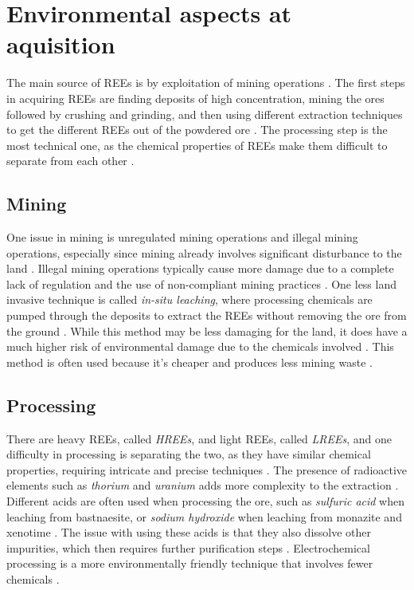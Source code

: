 
\section{Environmental aspects at aquisition}

The main source of REEs is by exploitation of mining operations \cite{REELandscape}. The first steps in acquiring REEs are finding deposits of high concentration, mining the ores followed by crushing and grinding, and then using different extraction techniques to get the different REEs out of the powdered ore \cite{REELandscape}. The processing step is the most technical one, as the chemical properties of REEs make them difficult to separate from each other \cite{britannica2024}.

\subsection{Mining}

One issue in mining is unregulated mining operations and illegal mining operations, especially since mining already involves significant disturbance to the land \cite{unregulatedMining}. Illegal mining operations typically cause more damage due to a complete lack of regulation and the use of non-compliant mining practices \cite{unregulatedMining}. One less land invasive technique is called \textit{in-situ leaching}, where processing chemicals are pumped through the deposits to extract the REEs without removing the ore from the ground \cite{REELandscape}. While this method may be less damaging for the land, it does have a much higher risk of environmental damage due to the chemicals involved \cite{unregulatedMining}. This method is often used because it's cheaper and produces less mining waste \cite{unregulatedMining}.

\subsection{Processing}

There are heavy REEs, called \textit{HREEs}, and light REEs, called \textit{LREEs}, and one difficulty in processing is separating the two, as they have similar chemical properties, requiring intricate and precise techniques \cite{HREELREE}. The presence of radioactive elements such as \textit{thorium} and \textit{uranium} adds more complexity to the extraction \cite{radioactive}. Different acids are often used when processing the ore, such as \textit{sulfuric acid} when leaching from bastnaesite, or \textit{sodium hydroxide} when leaching from monazite and xenotime \cite{REELandscape}. The issue with using these acids is that they also dissolve other impurities, which then requires further purification steps \cite{radioactive}. Electrochemical processing is a more environmentally friendly technique that involves fewer chemicals \cite{radioactive}.

